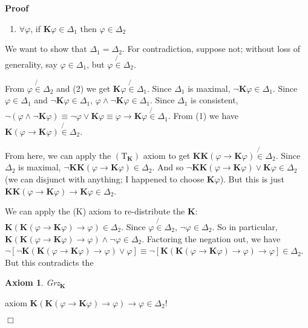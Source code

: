\documentclass{article}
\newcommand{\tmmathbf}[1]{\ensuremath{\boldsymbol{#1}}}
\newenvironment{proof}{\noindent\textbf{Proof\ }}{\hspace*{\fill}$\Box$\medskip}
\newtheorem{axiom}{Axiom}
\newcommand{\Know}{\tmmathbf{\text{K}}}
\begin{document}
\begin{proof}
\begin{description}
\begin{enumerate}
      \item $\forall \varphi$, if $\Know \varphi \in \Delta_1$ then $\varphi
      \in \Delta_2$
    \end{enumerate}
    We want to show that $\Delta_1 = \Delta_2$. For contradiction, suppose
    not; without loss of generality, say $\varphi \in \Delta_1$, but $\varphi
    \not{\in} \Delta_2$.
    
    From $\varphi \not{\in} \Delta_2$ and (2) we get $\Know \varphi \not{\in}
    \Delta_1$. Since $\Delta_1$ is maximal, $\neg \Know \varphi \in \Delta_1$.
    Since $\varphi \in \Delta_1$ and $\neg \Know \varphi \in \Delta_1$,
    $\varphi \wedge \neg \Know \varphi \in \Delta_1$. Since $\Delta_1$ is
    consistent, $\neg \left( \varphi \wedge \neg \Know \varphi \right) \equiv
    \neg \varphi \vee \Know \varphi \equiv \varphi \rightarrow \Know \varphi
    \not{\in} \Delta_1$. From (1) we have $\Know \left( \varphi \rightarrow
    \Know \varphi \right) \not{\in} \Delta_2$.
    
    From here, we can apply the $\left( \text{T}_{\Know} \right)$ axiom to get
    $\Know \Know \left( \varphi \rightarrow \Know \varphi \right) \not{\in}
    \Delta_2$. Since $\Delta_2$ is maximal, $\neg \Know \Know \left( \varphi
    \rightarrow \Know \varphi \right) \in \Delta_2$. And so $\neg \Know \Know
    \left( \varphi \rightarrow \Know \varphi \right) \vee \Know \varphi \in
    \Delta_2$ (we can disjunct with anything; I happened to choose $\Know
    \varphi$). But this is just $\Know \Know \left( \varphi \rightarrow \Know
    \varphi \right) \rightarrow \Know \varphi \in \Delta_2$.
    
    We can apply the (K) axiom to re-distribute the $\Know$: $\Know \left(
    \Know \left( \varphi \rightarrow \Know \varphi \right) \rightarrow \varphi
    \right) \in \Delta_2$. Since $\varphi \not{\in} \Delta_2$, $\neg \varphi
    \in \Delta_2$. So in particular, $\Know \left( \Know \left( \varphi
    \rightarrow \Know \varphi \right) \rightarrow \varphi \right) \wedge \neg
    \varphi \in \Delta_2$. Factoring the negation out, we have $\neg \left[
    \neg \Know \left( \Know \left( \varphi \rightarrow \Know \varphi \right)
    \rightarrow \varphi \right) \vee \varphi \right] \equiv \neg \left[ \Know
    \left( \Know \left( \varphi \rightarrow \Know \varphi \right) \rightarrow
    \varphi \right) \rightarrow \varphi \right] \in \Delta_2$. But this
    contradicts the \begin{axiom}
      Grz$_{\Know}$
    \end{axiom} axiom $\Know \left( \Know \left( \varphi \rightarrow \Know
    \varphi \right) \rightarrow \varphi \right) \rightarrow \varphi \in
    \Delta_2$!
    

\end{description}
\end{proof}
\end{document}
